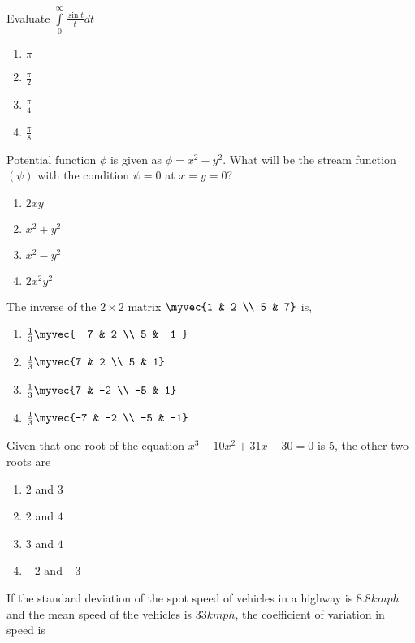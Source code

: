 \item Evaluate $\int\limits_{0}^{\infty} \frac{\sin t}{t} dt$
	\begin{enumerate}
                \item $\pi$
		\item $\frac{\pi}{2}$
		\item $\frac{\pi}{4}$
		\item $\frac{\pi}{8}$  
        \end{enumerate}
\item Potential function $\phi$ is given as $\phi=x^2-y^2$. What will be the stream function$(\psi)$ with the condition $\psi=0$ at $x=y=0$?
	\begin{enumerate}
                \item $2xy$
                \item $x^2+y^2$
                \item $x^2-y^2$
                \item $2x^2y^2$  
        \end{enumerate}
\item The inverse of the $2 \times 2$  matrix $\myvec{1 & 2 \\ 5 & 7}$  is,
\begin{enumerate}
	\item $\frac{1}{3} \myvec{ -7 & 2 \\ 5 & -1 }$\\
\item $ \frac{1}{3} \myvec{7 & 2 \\ 5 & 1}$\\
\item $\frac{1}{3} \myvec{7 & -2 \\ -5 & 1}$\\
\item $\frac{1}{3} \myvec{-7 & -2 \\ -5 & -1}$\\
		\end{enumerate}
\item Given that one root of the equation $x^3-10x^2+31x-30=0$ is $5$, the other two roots are
\begin{enumerate}
                \item $2$ and $3$
                \item $2$ and $4$
                \item $3$ and $4$
                \item $-2$ and $-3$
        \end{enumerate}
\item If the standard deviation of the spot speed of vehicles in a highway is $8.8 kmph$ and the mean speed of the vehicles is $33 kmph$, the coefficient of variation in speed is 
